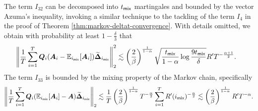 The term $I_{32}$ can be decomposed into $t_{\mathsf{mix}}$ martingales and bounded by the vector Azuma's inequality, invoking a similar technique to the tackling of the term $I_4$ in the proof of Theorem \ref{thm:markov-deltat-convergence}. With details omitted, we obtain with probability at least $1-\frac{\delta}{3}$ that
\begin{align}\label{eq:markov-bar-deltat-I32-bound}
&\left\|\frac{1}{T}\sum_{i=1}^T \bm{Q}_i(\bm{A}_i - \mathbb{E}_{i_{\mathsf{mix}}}[\bm{A}_i])\widetilde{\bm{\Delta}}_{i_{\mathsf{mix}}}\right\|_2^2 \lesssim \left(\frac{2}{\beta}\right)^{\frac{1}{1-\alpha}}  \sqrt{\frac{t_{\mathsf{mix}}}{1-\alpha}\log \frac{9t_{\mathsf{mix}}}{\delta}}R' T^{-\frac{\alpha+1}{2}}.
\end{align}
The term $I_{33}$ is bounded by the mixing property of the Markov chain, specifically
\begin{align}\label{eq:markov-bar-deltat-I33-bound}
\left\|\frac{1}{T}\sum_{i=1}^T \bm{Q}_i(\mathbb{E}_{i_{\mathsf{mix}}}[\bm{A}_i] - \bm{A}) \widetilde{\bm{\Delta}}_{i_{\mathsf{mix}}}\right\|_2 \lesssim \frac{1}{T} \left(\frac{2}{\beta}\right)^{\frac{1}{1-\alpha}} T^{-\frac{\alpha}{2}} \sum_{i=1}^T R' (i_{\mathsf{mix}})^{-\frac{\alpha}{2}} \lesssim \left(\frac{2}{\beta}\right)^{\frac{1}{1-\alpha}} R' T^{-\alpha}.
\end{align}
